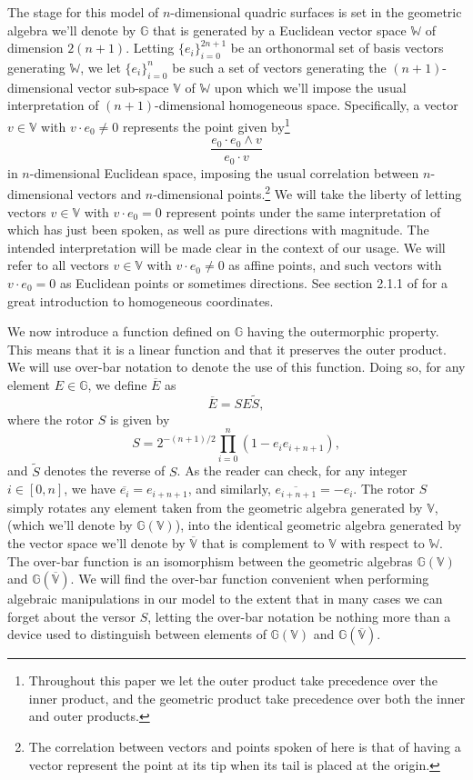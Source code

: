 \documentclass{birkjour}
\theoremstyle{definition}
\theoremstyle{remark}
\numberwithin{equation}{section}
\newcommand{\G}{\mathbb{G}}
\newcommand{\V}{\mathbb{V}}
\newcommand{\W}{\mathbb{W}}
\begin{document}
The stage for this model of $n$-dimensional quadric surfaces is set in the geometric
algebra we'll denote by $\G$ that is generated by a Euclidean vector space $\W$ of dimension
$2(n+1)$.  Letting $\{e_i\}_{i=0}^{2n+1}$ be an orthonormal set of basis vectors
generating $\W$, we let $\{e_i\}_{i=0}^n$ be such a set of vectors generating
the $(n+1)$-dimensional vector sub-space $\V$ of $\W$ upon which we'll impose the
usual interpretation of $(n+1)$-dimensional homogeneous space.  Specifically,
a vector $v\in\V$ with $v\cdot e_0\neq 0$ represents the point given by\footnote{Throughout this
paper we let the outer product take precedence over the inner product, and the geometric product
take precedence over both the inner and outer products.}
\begin{equation}
\frac{e_0\cdot e_0\wedge v}{e_0\cdot v}
\end{equation}
in $n$-dimensional Euclidean space, imposing the usual correlation between $n$-dimensional
vectors and $n$-dimensional points.\footnote{The correlation between
vectors and points spoken of here is that of having a vector represent the point
at its tip when its tail is placed at the origin.}  We will take the liberty of letting vectors $v\in\V$ with $v\cdot e_0=0$
represent points under the same interpretation of which has just been spoken, as
well as pure directions with magnitude.  The intended interpretation will be made clear
in the context of our usage.  We will refer to all vectors $v\in\V$ with $v\cdot e_0\neq 0$
as affine points, and such vectors with $v\cdot e_0=0$ as Euclidean points
or sometimes directions.  See section 2.1.1 of \cite{Birchfield98} for a great introduction to
homogeneous coordinates.

We now introduce a function defined on $\G$ having the outermorphic property.
This means that it is a linear function and that it preserves the outer product.  We will
use over-bar notation to denote the use of this function.  Doing so, for any
element $E\in\G$, we define $\overline{E}$ as
\begin{equation}
\overline{E} = SE\tilde{S},
\end{equation}
where the rotor $S$ is given by
\begin{equation}
S = 2^{-(n+1)/2}\prod_{i=0}^n\left(1-e_ie_{i+n+1}\right),
\end{equation}
and $\tilde{S}$ denotes the reverse of $S$.
As the reader can check, for any integer $i\in[0,n]$, we have $\overline{e_i}=e_{i+n+1}$,
and similarly, $\overline{e_{i+n+1}}=-e_i$.
The rotor $S$ simply rotates any element taken from the geometric algebra generated
by $\V$, (which we'll denote by $\G(\V)$), into the identical geometric
algebra generated by the vector
space we'll denote by $\overline{\V}$ that is complement to $\V$ with respect to $\W$.
The over-bar function is an isomorphism between the geometric algebras $\G(\V)$ and $\G(\overline{\V})$.
We will find the over-bar function convenient when performing algebraic manipulations in our model
to the extent that in many cases we can forget about the versor $S$, letting the over-bar notation be nothing
more than a device used to distinguish between elements of $\G(\V)$ and $\G(\overline{\V})$.
\end{document}
